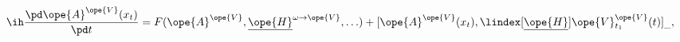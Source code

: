 \begin{equation}	\label{12.106}
\ih \frac{\pd\ope{A}^{\ope{V}}(x_t)}{\pd t}
=
F( \ope{A}^{\ope{V}}, \underline{\ope{H}}^{\omega\to\ope{V}},\ldots )
+
[
\ope{A}^{\ope{V}}(x_t)
,
 \lindex[\underline{\ope{H}}]{\ope{V}}{} _{t_1}^{\ope{V}}(t)
]_{\_} ,
	\end{equation}

